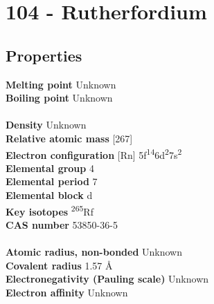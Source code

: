 \section{104 - Rutherfordium}
\label{sec:elem-rutherfordium}
\subsection{Properties}
\textbf{Melting point} Unknown\\
\textbf{Boiling point} Unknown\\
\\
\textbf{Density} Unknown\\
\textbf{Relative atomic mass} [267]\\
\textbf{Electron configuration} [Rn] 5f\textsuperscript{14}6d\textsuperscript{2}7s\textsuperscript{2}\\
\textbf{Elemental group} 4\\
\textbf{Elemental period} 7\\
\textbf{Elemental block} d\\
\textbf{Key isotopes} \textsuperscript{265}Rf\\
\textbf{CAS number} 53850-36-5\\
\\
\textbf{Atomic radius, non-bonded} Unknown\\
\textbf{Covalent radius} 1.57 Å\\
\textbf{Electronegativity (Pauling scale)} Unknown\\
\textbf{Electron affinity} Unknown\\